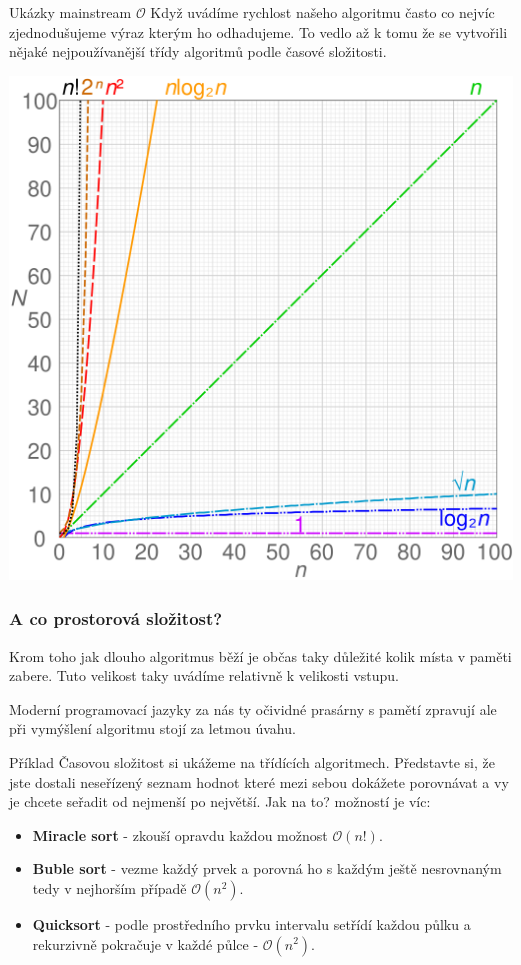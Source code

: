 \documentclass{beamer}
\newcommand{\bigO}{\mathcal{O}}
\begin{document}
\begin{frame}{Ukázky mainstream $\bigO$}
Když uvádíme rychlost našeho algoritmu často co nejvíc zjednodušujeme výraz
kterým ho odhadujeme. To vedlo až k tomu že se vytvořili nějaké nejpoužívanější
třídy algoritmů podle časové složitosti. 

\centering
\includegraphics[scale=0.16]{bigo.png}
 \end{frame}

\begin{frame}
\frametitle{A co prostorová složitost?}
Krom toho jak dlouho algoritmus běží je občas taky důležité kolik místa v paměti
zabere. Tuto velikost taky uvádíme relativně k velikosti vstupu.

\vfill

Moderní programovací jazyky za nás ty očividné prasárny s pamětí zpravují ale
při vymýšlení algoritmu stojí za letmou úvahu.
\end{frame}

\begin{frame}{Příklad}
 Časovou složitost si ukážeme na třídících algoritmech. Představte si, že jste
 dostali neseřízený seznam hodnot které mezi sebou dokážete porovnávat a vy je
 chcete seřadit od nejmenší po největší. Jak na to? možností je víc:

 \begin{itemize}
  \item \textbf{Miracle sort} - zkouší opravdu každou možnost $\bigO(
   n!)$.
  \item \textbf{Buble sort} - vezme každý prvek a porovná ho s každým ještě
   nesrovnaným tedy v nejhorším případě $\bigO(n^2)$.
  \item \textbf{Quicksort} - podle prostředního prvku intervalu setřídí každou
   půlku a rekurzivně pokračuje v každé půlce -  $\bigO(n^2)$.
 \end{itemize}
\end{frame}
\end{document}
